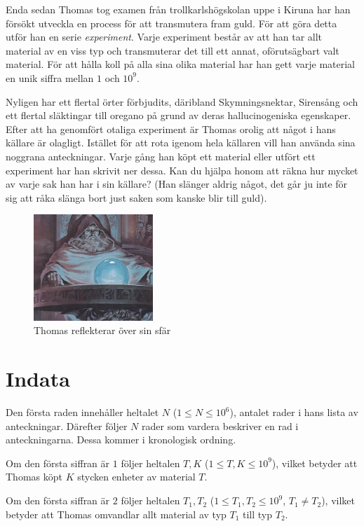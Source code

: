 Enda sedan Thomas tog examen från trollkarlshögskolan uppe i Kiruna har han försökt utveckla en process för att transmutera fram guld. För att göra detta utför
han en serie \textit{experiment}. Varje experiment består av att han tar allt material av en viss typ och transmuterar det till ett annat, oförutsägbart valt
material. För att hålla koll på alla sina olika material har han gett varje material en unik siffra mellan $1$ och $10^9$. 

Nyligen har ett flertal örter förbjudits, däribland Skymningsnektar, Sirensång och ett flertal släktingar till oregano på grund av deras
hallucinogeniska egenskaper. Efter att ha genomfört otaliga experiment är Thomas orolig att något i hans källare är olagligt. Istället för att rota
igenom hela källaren vill han använda sina noggrana anteckningar. Varje gång han köpt ett material eller utfört ett experiment har han skrivit ner dessa.
Kan du hjälpa honom att räkna hur mycket av varje sak han har i sin källare? (Han slänger aldrig något, det går ju inte för sig att råka slänga bort
just saken som kanske blir till guld).

\begin{figure}
    \centering
        \includegraphics[width=0.4\textwidth]{thomas.jpg}
    \caption{Thomas reflekterar över sin sfär}
\end{figure}

\section*{Indata}
Den första raden innehåller heltalet $N$ ($1 \leq N \leq 10^6$), antalet rader i hans lista av anteckningar.
Därefter följer $N$ rader som vardera beskriver en rad i anteckningarna. Dessa kommer i kronologisk ordning.

Om den första siffran är $1$ följer heltalen $T,K$ ($1 \leq T, K \leq 10^9$), vilket betyder att Thomas köpt $K$ stycken enheter av material $T$.

Om den första siffran är $2$ följer heltalen $T_1, T_2$ ($1 \leq T_1, T_2 \leq 10^9$, $T_1 \neq T_2$), vilket betyder att Thomas omvandlar allt material av typ $T_1$ till typ $T_2$.


